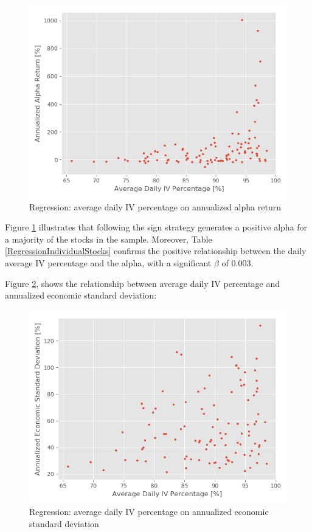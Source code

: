 \begin{figure}[h]
    \centering
    \includegraphics[scale = 0.5]{Plot/IndividualStockRegression2.png}
    \caption{Regression: average daily IV percentage on annualized alpha return}
    \label{IVAlphaRegression}
\end{figure}

\newpage

Figure \ref{IVAlphaRegression} illustrates that following the sign strategy generates a positive alpha for a majority of the stocks in the sample. Moreover, Table \ref{RegressionIndividualStocks} confirms the positive relationship between the daily average IV percentage and the alpha, with a significant $\beta$ of $0.003$. 

Figure \ref{IVtoVol}, shows the relationship between average daily IV percentage and annualized economic standard deviation:

\begin{figure}[h]
    \centering
    \includegraphics[scale = 0.5]{Plot/IVvsEconomicVolatilityRegression.png}
    \caption{Regression: average daily IV percentage on annualized economic standard deviation}
    \label{IVtoVol}
\end{figure}

